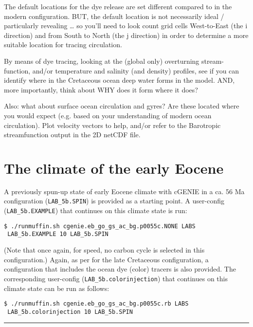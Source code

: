 \documentclass[11pt,fleqn]{book} %
\begin{document}
The default locations for the dye release are set different compared to in the modern configuration. BUT, the default location is not necessarily ideal / particularly revealing … so you’ll need to look count grid cells West-to-East (the i direction) and from South to North (the j direction) in order to determine a more suitable location for tracing circulation.

By means of dye tracing, looking at the (global only) overturning stream-function, and/or temperature and salinity (and density) profiles, see if you can identify where in the Cretaceous ocean deep water forms in the model. AND, more importantly, think about WHY does it form where it does?

Also: what about surface ocean circulation and gyres? Are these located where you would expect (e.g. based on your understanding of modern ocean circulation). Plot velocity vectors to help, and/or refer to the Barotropic streamfunction output in the 2D netCDF file.

%
\newpage


\section{The climate of the early Eocene}

A previously spun-up state of early Eocene climate with cGENIE in a ca. 56 Ma configuration (\texttt{LAB\_5b.SPIN}) is provided as a starting point. A user-config (\texttt{LAB\_5b.EXAMPLE}) that continues on this climate state is run: 
\begin{verbatim}
$ ./runmuffin.sh cgenie.eb_go_gs_ac_bg.p0055c.NONE LABS 
 LAB_5b.EXAMPLE 10 LAB_5b.SPIN 
\end{verbatim}
(Note that once again, for speed, no carbon cycle is selected in this configuration.)
Again, as per for the late Cretaceous configuration, a configuration that includes the ocean dye (color) tracers is also provided. The corresponding user-config (\texttt{LAB\_5b.colorinjection}) that continues on this climate state can be run as follows: 
\begin{verbatim}
$ ./runmuffin.sh cgenie.eb_go_gs_ac_bg.p0055c.rb LABS 
 LAB_5b.colorinjection 10 LAB_5b.SPIN 
\end{verbatim}
 
\vspace{1mm}
\noindent\rule{4cm}{0.1mm}
\vspace{2mm}
\end{document}
